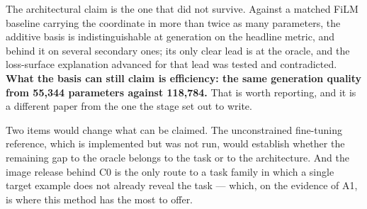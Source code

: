 \documentclass{article}
\begin{document}
The architectural claim is the one that did not survive. Against a matched FiLM
baseline carrying the coordinate in more than twice as many parameters, the additive basis
is indistinguishable at generation on the headline metric, and behind it on several
secondary ones; its only clear lead is at the oracle, and the loss-surface explanation
advanced for that lead was tested and contradicted. \textbf{What the basis can still claim is
efficiency: the same generation quality from 55{,}344 parameters against 118{,}784.} That is
worth reporting, and it is a different paper from the one the stage set out to write.

Two items would change what can be claimed. The unconstrained fine-tuning reference, which
is implemented but was not run, would establish whether the remaining gap to the oracle
belongs to the task or to the architecture. And the image release behind C0 is the only
route to a task family in which a single target example does not already reveal the task ---
which, on the evidence of A1, is where this method has the most to offer.
\end{document}
